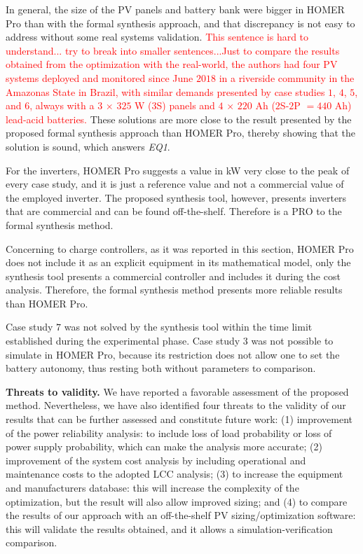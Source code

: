 \documentclass[runningheads]{llncs}
\begin{document}
In general, the size of the PV panels and battery bank were bigger in HOMER Pro than with the formal synthesis approach, and that discrepancy is not easy to address without some real systems validation. \textcolor{red}{This sentence is hard to understand... try to break into smaller sentences...Just to compare the results obtained from the optimization with the real-world, the authors had four PV systems deployed and monitored since June $2018$ in a riverside community in the Amazonas State in Brazil, with similar demands presented by case studies $1$, $4$, $5$, and $6$, always with a $3$ $\times$ $325$ W ($3$S) panels and $4$ $\times$ $220$ Ah ($2$S-$2$P $= 440$ Ah) lead-acid batteries.} These solutions are more close to the result presented by the proposed formal synthesis approach than HOMER Pro, thereby showing that the solution is sound, which answers \textit{EQ1}.

For the inverters, HOMER Pro suggests a value in kW very close to the peak of every case study, and it is just a reference value and not a commercial value of the employed inverter. The proposed synthesis tool, however, presents inverters that are commercial and can be found off-the-shelf. Therefore is a PRO to the formal synthesis method.

Concerning to charge controllers, as it was reported in this section, HOMER Pro does not include it as an explicit equipment in its mathematical model, only the synthesis tool presents a commercial controller and includes it during the cost analysis. Therefore, the formal synthesis method presents more reliable results than HOMER Pro.

Case study $7$ was not solved by the synthesis tool within the time limit established during the experimental phase. Case study $3$ was not possible to simulate in HOMER Pro, because its restriction does not allow one to set the battery autonomy, thus resting both without parameters to comparison.

\noindent \textbf{Threats to validity.} We have reported a favorable assessment of the proposed method. Nevertheless, we have also identified four threats to the validity of our results that can be further assessed and constitute future work: (1) improvement of the power reliability analysis: to include loss of load probability or loss of power supply probability, which can make the analysis more accurate; (2) improvement of the system cost analysis by including operational and maintenance costs to the adopted LCC analysis; (3) to increase the equipment and manufacturers database: this will increase the complexity of the optimization, but the result will also allow improved sizing; and (4) to compare the results of our approach with an off-the-shelf PV sizing/optimization software: this will validate the results obtained, and it allows a simulation-verification comparison.
\end{document}
